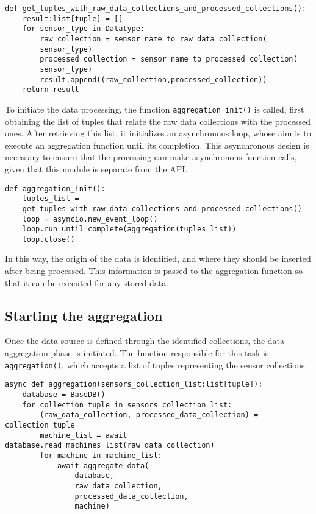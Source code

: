 \begin{Verbatim}[fontsize=\small, baselinestretch=0.8]
def get_tuples_with_raw_data_collections_and_processed_collections():
    result:list[tuple] = []
    for sensor_type in Datatype:
        raw_collection = sensor_name_to_raw_data_collection(
        sensor_type)
        processed_collection = sensor_name_to_processed_collection(
        sensor_type)
        result.append((raw_collection,processed_collection))
    return result
\end{Verbatim}

To initiate the data processing, the function \texttt{aggregation\_init()} is called, first obtaining the list of tuples that relate the raw data collections with the processed ones. After retrieving this list, it initializes an asynchronous loop, whose aim is to execute an aggregation function until its completion. This asynchronous design is necessary to ensure that the processing can make asynchronous function calls, given that this module is separate from the \gls{API}.

\begin{Verbatim}[fontsize=\small, baselinestretch=0.8]
def aggregation_init():
    tuples_list = 
    get_tuples_with_raw_data_collections_and_processed_collections()
    loop = asyncio.new_event_loop()
    loop.run_until_complete(aggregation(tuples_list))
    loop.close()
\end{Verbatim}

In this way, the origin of the data is identified, and where they should be inserted after being processed. This information is passed to the aggregation function so that it can be executed for any stored data.

\subsection{Starting the aggregation}
Once the data source is defined through the identified collections, the data aggregation phase is initiated. The function responsible for this task is \texttt{aggregation()}, which accepts a list of tuples representing the sensor collections.

\begin{Verbatim}[fontsize=\small, baselinestretch=0.8]
async def aggregation(sensors_collection_list:list[tuple]):
    database = BaseDB()
    for collection_tuple in sensors_collection_list:
        (raw_data_collection, processed_data_collection) = collection_tuple
        machine_list = await database.read_machines_list(raw_data_collection)
        for machine in machine_list:
            await aggregate_data(
                database,
                raw_data_collection,
                processed_data_collection,
                machine)
\end{Verbatim}

